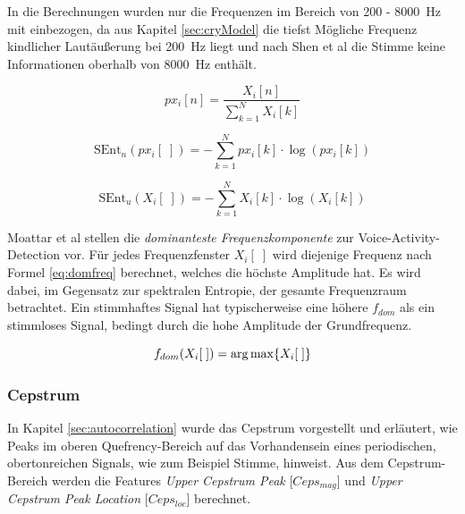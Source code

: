 In die Berechnungen wurden nur die Frequenzen im Bereich von 200 - \SI{8000}{\hertz} mit einbezogen, da aus Kapitel \ref{sec:cryModel} die tiefst Mögliche Frequenz kindlicher Lautäußerung bei \SI{200}{\hertz} liegt und nach Shen et al \cite{vad_entropie02} die Stimme keine Informationen oberhalb von \SI{8000}{\hertz} enthält.

\begin{equation}
px_i[n] = \frac{X_i[n]}{\sum_{k=1}^{N} X_i[k]}
\label{eq:norm_spek}
\end{equation}

\begin{equation}
\text{SEnt}_n(px_i[\;]) = -\sum_{k=1}^{N}px_i[k] \cdot\log(px_i[k])
\label{eq:norm_se}
\end{equation}

\begin{equation}
\text{SEnt}_u(X_i[\;]) = -\sum_{k=1}^{N}X_i[k] \cdot\log(X_i[k])
\label{eq:unnnorm_se}
\end{equation}

Moattar et al \cite[S. 2550]{vad_Easy} stellen die \emph{dominanteste Frequenzkomponente} zur Voice-Activity-Detection vor. Für jedes Frequenzfenster $X_i[\;]$ wird diejenige Frequenz nach Formel \ref{eq:domfreq} berechnet, welches die höchste Amplitude hat. Es wird dabei, im Gegensatz zur spektralen Entropie, der gesamte Frequenzraum betrachtet. Ein stimmhaftes Signal hat typischerweise eine höhere $f_{dom}$ als ein stimmloses Signal, bedingt durch die hohe Amplitude der Grundfrequenz.

\begin{equation}
f_{dom}(X_i[\;]) = \operatorname*{arg\,max} \{X_i[\;]\}
\label{eq:domfreq}
\end{equation}


\subsubsection{Cepstrum}
\label{sec:cepstrum-feature}

In Kapitel \ref{sec:autocorrelation} wurde das Cepstrum vorgestellt und erläutert, wie Peaks im oberen Quefrency-Bereich auf das Vorhandensein eines periodischen, obertonreichen Signals, wie zum Beispiel Stimme, hinweist. Aus dem Cepstrum-Bereich werden die Features \emph{Upper Cepstrum Peak} [$Ceps_{mag}$] und \emph{Upper Cepstrum Peak Location} [$Ceps_{loc}$] berechnet.

